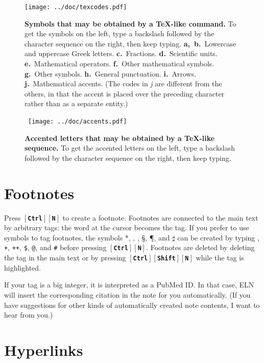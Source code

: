 \documentclass[11pt]{report}
\def\keystroke#1{$\left[\right.\!${\tt\bfseries #1}$\!\left.\right]$}
\def\keycombo#1#2{\keystroke{#1}\keystroke{#2}}
\def\keycontrol#1{\keycombo{Ctrl}{#1}}
\def\controlshift#1{\keystroke{Ctrl}\keystroke{Shift}\keystroke{#1}}
\begin{document}
\begin{figure}
\noindent\texttt{[image: ../doc/texcodes.pdf]}\vspace{-7pt}

\caption{{\bf Symbols that may be obtained by a TeX-like command.} To
  get the symbols on the left, type a backslash followed by the character sequence on the
  right, then keep typing.
  {\bf a,~b.}~Lowercase and uppercase Greek letters.
  {\bf c.}~Fractions.
  {\bf d.}~Scientific units.
  {\bf e.}~Mathematical operators.
 {\bf f.}~Other mathematical symbols.
  {\bf g.}~Other symbols.
  {\bf h.}~General punctuation.
  {\bf i.}~Arrows.
  {\bf j.}~Mathematical accents.
  (The codes in \emph{j} are
  different from the others, in that the accent is placed over the
  preceding character rather than as a separate
  entity.)}\label{fig:texcodes}
\end{figure}

\begin{figure}
\noindent~\hfill\texttt{[image: ../doc/accents.pdf]}\vspace{-7pt}\hfill~

\caption{{\bf Accented letters that may be obtained by a TeX-like sequence.} To
  get the accented letters on the left, type a backslash followed by the character sequence on the
  right, then keep typing.}\label{fig:accents}
\end{figure}


\section{Footnotes}

Press \keycontrol{N} to create a footnote. Footnotes are connected to
the main text by arbitrary tags: the word at the cursor becomes the
tag.  If you prefer to use symbols to tag footnotes, the symbols *,
\dag, \ddag, \S, \P, and $\sharp$ can be created by typing {\tt *},
    {\tt +}, {\tt ++}, {\tt\$}, {\tt @}, and {\tt \#} before pressing
    \keycontrol{N}. Footnotes are deleted by deleting the tag in the
    main text or by pressing \controlshift{N} while the tag is
    highlighted.

If your tag is a big integer, it is interpreted as a PubMed ID. In
that case, ELN will insert the corresponding citation in the note for
you automatically. (If you have suggestions for other kinds of
automatically created note contents, I want to hear from you.)

\section{Hyperlinks}
\end{document}
